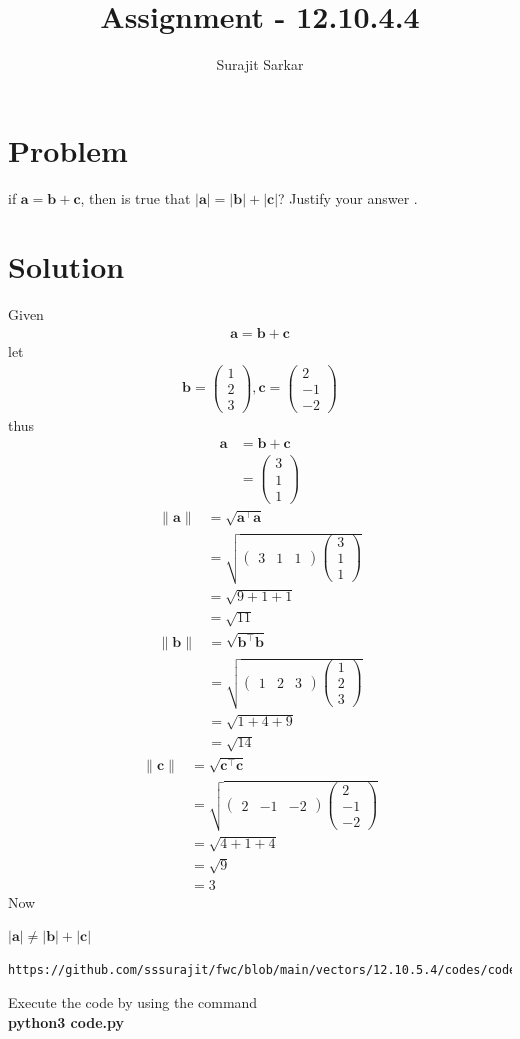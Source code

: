 \documentclass[journal,12pt,twocolumn]{IEEEtran}
\title{\mytitle}
\title{
Assignment - 12.10.4.4
}
\author{Surajit Sarkar}
\newcommand{\myvec}[1]{\ensuremath{\begin{pmatrix}#1\end{pmatrix}}}
\providecommand{\norm}[1]{\lVert#1\rVert}
\let\vec\mathbf
\begin{document}
\maketitle
\tableofcontents
\bigskip
\section{\textbf{Problem}}
if $\vec{a}=\vec{b}+\vec{c}$, then is true that $|\vec{a}|=|\vec{b}|+|\vec{c}|$?
Justify your answer .
\section{\textbf{Solution}}
Given
\begin{align}
    \vec{a}=\vec{b}+\vec{c}
\end{align}
let
\begin{align}
    \vec{b}=\myvec{1\\2\\3},\vec{c}=\myvec{2\\-1\\-2}
\end{align}
thus
\begin{align}
    \vec{a}&=\vec{b}+\vec{c}\\
    &=\myvec{3\\1\\1}
\end{align}
\begin{align}
    \norm{\vec{a}}&=\sqrt{\vec{a}^{\top}\vec{a}}\\
    &=\sqrt{\myvec{3&1&1}\myvec{3\\1\\1}}\\
    &=\sqrt{9+1+1}\\
    &=\sqrt{11}
\end{align}
\begin{align}
    \norm{\vec{b}}&=\sqrt{\vec{b}^{\top}\vec{b}}\\
    &=\sqrt{\myvec{1&2&3}\myvec{1\\2\\3}}\\
    &=\sqrt{1+4+9}\\
    &=\sqrt{14}
\end{align}
\begin{align}
    \norm{\vec{c}}&=\sqrt{\vec{c}^{\top}\vec{c}}\\
    &=\sqrt{\myvec{2&-1&-2}\myvec{2\\-1\\-2}}\\
    &=\sqrt{4+1+4}\\
    &=\sqrt{9}\\
    &=3
\end{align}
Now
\begin{center}
    $|\vec{a}|\neq|\vec{b}|+|\vec{c}|$
\end{center}
\begin{lstlisting}
https://github.com/sssurajit/fwc/blob/main/vectors/12.10.5.4/codes/code.py
\end{lstlisting}
Execute the code by using the command\\
\textbf{python3 code.py}
\end{document}
